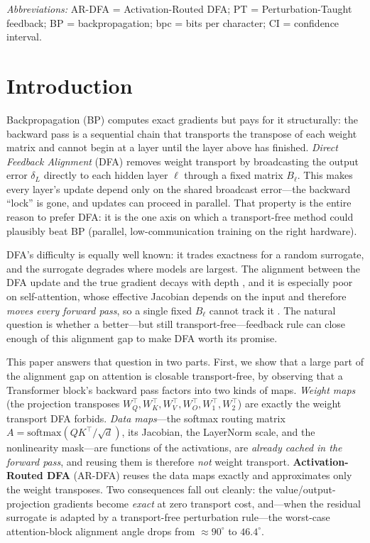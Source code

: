 \documentclass[11pt]{article}
\newcommand{\ARDFA}{\textsc{AR-DFA}}
\newcommand{\PT}{\textsc{PT}}
\begin{document}
\noindent\textit{Abbreviations:} \ARDFA{} = Activation-Routed DFA; \PT{} = Perturbation-Taught feedback; BP = backpropagation; bpc = bits per character; CI = confidence interval.

\section{Introduction}\label{sec:intro}
Backpropagation (BP) computes exact gradients but pays for it structurally: the backward pass is a sequential chain that transports the transpose of each weight matrix and cannot begin at a layer until the layer above has finished. \emph{Direct Feedback Alignment} (DFA) \citep{lillicrap2016random,nokland2016direct} removes weight transport by broadcasting the output error $\delta_L$ directly to each hidden layer $\ell$ through a fixed matrix $B_\ell$. This makes every layer's update depend only on the shared broadcast error---the backward ``lock'' is gone, and updates can proceed in parallel. That property is the entire reason to prefer DFA: it is the one axis on which a transport-free method could plausibly beat BP (parallel, low-communication training on the right hardware).

DFA's difficulty is equally well known: it trades exactness for a random surrogate, and the surrogate degrades where models are largest. The alignment between the DFA update and the true gradient decays with depth \citep{bartunov2018assessing,refinetti2021align}, and it is especially poor on self-attention, whose effective Jacobian depends on the input and therefore \emph{moves every forward pass}, so a single fixed $B_\ell$ cannot track it \citep{launay2020direct}. The natural question is whether a better---but still transport-free---feedback rule can close enough of this alignment gap to make DFA worth its promise.

This paper answers that question in two parts. First, we show that a large part of the alignment gap on attention is closable transport-free, by observing that a Transformer block's backward pass factors into two kinds of maps. \emph{Weight maps} (the projection transposes $W_Q^\top,W_K^\top,W_V^\top,W_O^\top,W_1^\top,W_2^\top$) are exactly the weight transport DFA forbids. \emph{Data maps}---the softmax routing matrix $A=\mathrm{softmax}(QK^\top/\sqrt{d})$, its Jacobian, the LayerNorm scale, and the nonlinearity mask---are functions of the activations, are \emph{already cached in the forward pass}, and reusing them is therefore \emph{not} weight transport. \textbf{Activation-Routed DFA} (\ARDFA) reuses the data maps exactly and approximates only the weight transposes. Two consequences fall out cleanly: the value/output-projection gradients become \emph{exact} at zero transport cost, and---when the residual surrogate is adapted by a transport-free perturbation rule---the worst-case attention-block alignment angle drops from $\approx\!90^{\circ}$ to $46.4^{\circ}$.
\end{document}
